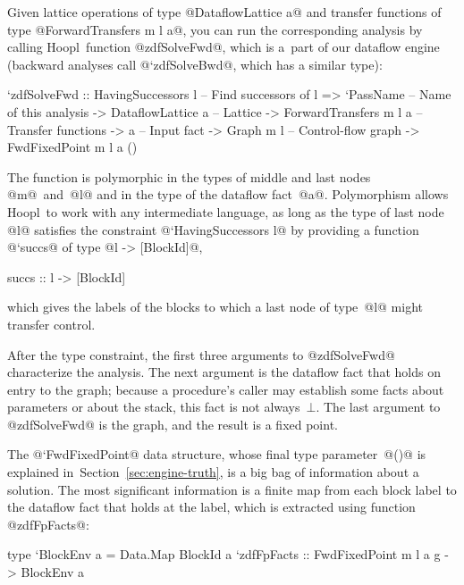 \documentclass[blockstyle,preprint,natbib,nocopyrightspace]{sigplanconf}
\newcommand\ourlib{Hoopl}  %
\newcommand\secref[1]{Section~\ref{sec:#1}}
\newcommand\seclabel[1]{\label{sec:#1}}
\begin{document}
\seclabel{zdfSolveFwd}

Given lattice operations of type @DataflowLattice a@
and transfer functions of type @ForwardTransfers m l a@,
you can run the corresponding analysis by calling \ourlib\
function @zdfSolveFwd@, which is a~part of our dataflow engine
(backward analyses call @`zdfSolveBwd@, which has a similar type):
\begin{code}
 `zdfSolveFwd 
  :: HavingSuccessors l     -- Find successors of l
  => `PassName               -- Name of this analysis
  -> DataflowLattice a      -- Lattice
  -> ForwardTransfers m l a -- Transfer functions
  -> a                      -- Input fact
  -> Graph m l              -- Control-flow graph
  -> FwdFixedPoint m l a ()
\end{code}
The function is polymorphic in the types of middle and last nodes
@m@~and~@l@ and in the type of the dataflow fact~@a@.
Polymorphism allows \ourlib\ to work with any intermediate
language, as long as the type of last node @l@ satisfies the constraint
@`HavingSuccessors l@ by providing a function
\ifcutting
@`succs@ of type @l -> [BlockId]@,
\else
\begin{code}
  succs :: l -> [BlockId]
\end{code}
\fi
which gives the labels of the blocks to which a last node of type~@l@
might transfer control.

After the type constraint, 
the first three arguments to @zdfSolveFwd@ characterize the analysis.
The next argument is the dataflow fact that holds on entry to the
graph;
because a procedure's caller may establish some facts about
parameters or about the stack,
this fact
is not always~$\bot$.
The last argument to @zdfSolveFwd@ is the graph, and the result is a 
fixed point.

\ifpagetuning\enlargethispage{0.5\baselineskip}\fi


The @`FwdFixedPoint@ data structure,
whose final type parameter~@()@ is 
explained in~\secref{engine-truth},
 is a big bag
of information about a solution.
The most significant information is
a finite map from each block label to the dataflow fact that holds at
the label, which is extracted using function @zdfFpFacts@:
\begin{code}
type `BlockEnv a = Data.Map BlockId a
`zdfFpFacts :: FwdFixedPoint m l a g -> BlockEnv a
\end{code}
\end{document}
